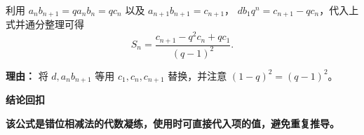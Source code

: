 \begin{proofbox}
\begin{description}[style=nextline, leftmargin=2.8em, labelsep=0.5em, itemsep=0.55em]
    \item[\textbf{步骤七（化为目标形式）：}]
    利用 \(a_n b_{n+1} = q a_n b_n = q c_n\) 以及 \(a_{n+1} b_{n+1} = c_{n+1}\)，
    \(d b_1 q^{n} = c_{n+1} - q c_n\)，代入上式并通分整理可得
    \[
    S_n = \frac{c_{n+1} - q^2 c_n + q c_1}{(q-1)^2}.
    \]
    \par\textbf{理由：} 将 \(d, a_n b_{n+1}\) 等用 \(c_1, c_n, c_{n+1}\) 替换，并注意 \((1-q)^2 = (q-1)^2\)。
\end{description}

\medskip
\textbf{\textcolor{CProof}{结论回扣}}

\textbf{该公式是错位相减法的代数凝练，使用时可直接代入项的值，避免重复推导。}
\end{proofbox}
